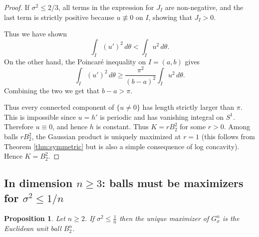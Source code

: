 \documentclass[12pt,oneside,reqno]{amsart}
\numberwithin{equation}{section}
\newtheorem{proposition}[theorem]{Proposition}
\theoremstyle{remark}
\begin{document}
\begin{proof}
If \(\sigma^2\le 2/3\), all terms in the expression for $J_I$ are non-negative, and the last
term is strictly positive because \(u\not\equiv0\) on \(I\), showing that  $J_I>0$. 

Thus we have shown 
\[
        \int_I (u')^2\,d\theta
        <
        \int_I u^2\,d\theta.
\]
On the other hand, the  Poincar\'{e} inequality on  
\(I=(a,b)\) gives
\[
        \int_I (u')^2\,d\theta
        \ge
        \frac{\pi^2}{(b-a)^2}
        \int_I u^2\,d\theta .
\]
Combining the two we get that 
$  b-a>\pi$. 

Thus every connected component of \(\{u\ne0\}\) has length strictly larger
than \(\pi\). This is impossible since \(u=h'\) is periodic and
has vanishing integral on \( S^1\).
Therefore \(u\equiv0\), and hence \(h\) is constant. Thus \(K=rB_2^2\)
for some \(r>0\). Among balls $rB_2^2$, the Gaussian product
is uniquely maximized at \(r=1\) (this follows from Theorem \ref{thm:symmetric} but is also a simple consequence of log concavity). Hence \(K=B_2^2\).
\end{proof}


\subsection{In dimension $n\ge3$: balls must be maximizers for $\sigma^2\le 1/n$}


\begin{proposition}
\label{prop:general-rigidity-monotone-range}
Let \(n\ge2\). If $
        \sigma^2\le \frac1n$
then the unique maximizer of $G^n_\sigma$ 
 is the
Euclidean unit ball \(B_2^n\).
\end{proposition}
\end{document}
